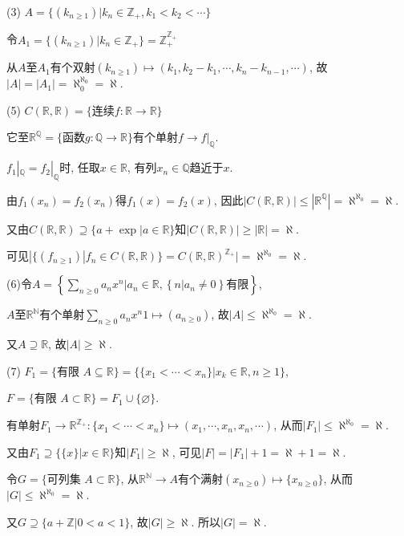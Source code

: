\begin{solution}

(3) $A=\{(k_{n\geqslant1})|k_n\in \mathbb{Z}_+, k_1<k_2<\cdots\}$

令$A_1=\{(k_{n\geqslant1})|k_n\in \mathbb{Z}_+\}=\mathbb{Z}_+^{\mathbb{Z}_+}$

从$A$至$A_1$有个双射$(k_{n\geqslant1})\mapsto(k_1, k_2-k_1, \cdots, k_n-k_{n-1}, \cdots)$, 故$|A|=|A_1|=\aleph_0^{\aleph_0}=\aleph.$

(5) $C(\mathbb{R}, \mathbb{R})=\{$连续$f:\mathbb{R}\rightarrow\mathbb{R}\}$

它至$\mathbb{R}^{\mathbb{Q}}=\{$函数$g:\mathbb{Q}\rightarrow\mathbb{R}\}$有个单射$f\rightarrow f|_{\mathbb{Q}}.$

$f_1|_{\mathbb{Q}}=f_2|_{\mathbb{Q}}$时, 任取$x\in \mathbb{R}$, 有列$x_n\in\mathbb{Q}$趋近于$x$.

由$f_{1}(x_{n})=f_{2}(x_{n})$得$f_{1}(x)=f_{2}(x)$,
因此$|C(\mathbb{R}, \mathbb{R})|\leqslant|\mathbb{R}^{\mathbb{Q}}|=\aleph^{\aleph_0}=\aleph.$

又由$C(\mathbb{R}, \mathbb{R})\supseteq\{a+\exp|a\in\mathbb{R}\}$知$|C(\mathbb{R}, \mathbb{R})|\geqslant|\mathbb{R}|=\aleph.$

可见$|\{(f_{n\geqslant1})|f_{n}\in C(\mathbb{R}, \mathbb{R})\}=C(\mathbb{R}, \mathbb{R})^{\mathbb{Z}_+}|=\aleph^{\aleph_0}=\aleph.$

(6)令$A=\left\{\sum\limits_{n\geqslant0}a_{n}x^{n}\Big|a_{n}\in\mathbb{R}, \left\{n|a_{n}\neq 0\right\}\text{有限}\right\}$,

$A$至$\mathbb{R}^{\mathbb{N}}$有个单射$\sum\limits_{n\geqslant0}a_{n}x^{n}1\mapsto(a_{n\geqslant0})$, 故$|A|\leqslant\aleph^{\aleph_0}=\aleph.$

又$A\supseteq\mathbb{R}$, 故$|A|\geqslant\aleph$.

(7)
$F_{1}=\{\text{有限 }A\subseteq \mathbb{R}\}=\{\{x_{1}<\cdots<x_{n}\}|x_{k}\in \mathbb{R}, n\geqslant 1\}$,

$F=\{\text{有限 }A\subset \mathbb{R} \}=F_1\cup\{\varnothing\}$.

有单射$F_1\to\mathbb{R}^{\mathbb{Z}_+}:\{x_1<\cdots<x_n\}\mapsto(x_1, \cdots, x_n, x_n, \cdots)$, 从而$|F_1|\leqslant\aleph^{\aleph_0}=\aleph.$

又由$F_1\supseteq\{\{x\}|x\in \mathbb{R}\}$知$|F_1|\geqslant\aleph$, 可见$|F|=|F_1|+1=\aleph+1=\aleph$.

令$G=\{\text{可列集 }A\subset\mathbb{R}\}$, 从$\mathbb{R}^{\mathbb{N}}\to A$有个满射$(x_{n\geqslant 0})\mapsto\{x_{n\geqslant0}\}$, 从而$|G|\leqslant\aleph^{\aleph_0}=\aleph$.

又$G\supseteq\{a+\mathbb{Z}|0<a<1\}$, 故$|G|\geqslant \aleph$. 所以$|G|=\aleph$.
\end{solution}

